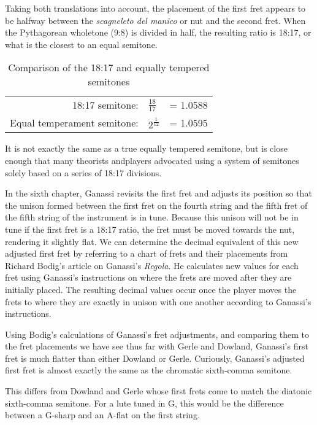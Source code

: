 Taking both translations into account, the placement of the first fret appears to be
halfway between the \textit{scagneleto del manico} or nut and the second fret.  When
the Pythagorean wholetone (9:8) is divided in half, the resulting ratio is 18:17, or
what is the closest to an equal semitone.
\begin{table}[h!]
    \begin{center}
    \begin{tabular}{ r l l }
        18:17 semitone:             & $ \frac{18}{17}  $ & = 1.0588 \\
        Equal temperament semitone: & $ 2^\frac{1}{12} $ & = 1.0595 \\
    \end{tabular}
    \end{center}
    \caption{Comparison of the 18:17 and equally tempered semitones}
\end{table}
It is not exactly the same as a true equally tempered semitone, but is close enough
that many theorists andplayers advocated using a system of semitones solely based on a
series of 18:17 divisions.

In the sixth chapter, Ganassi revisits the first fret and adjusts its position so that
the unison formed between the first fret on the fourth string and the fifth fret of the
fifth string of the instrument is in tune.\autocite[67]{RB:3}  Because this unison will
not be in tune if the first fret is a 18:17 ratio, the fret must be moved towards the
nut, rendering it slightly flat. We can determine the  decimal equivalent of this new
adjusted first fret by referring to a chart of frets and their placements from Richard
Bodig's article on Ganassi's \textit{Regola}. He calculates new values for each fret
using Ganassi's instructions on where the frets are moved after they are initially
placed. The resulting decimal values occur once the player moves the frets to where
they are exactly in unison with one another according to Ganassi's instructions.

Using Bodig's calculations of Ganassi's fret adjustments, and comparing them to the
fret placements we have see thus far with Gerle and Dowland, Ganassi's first fret is
much flatter than either Dowland or Gerle.  Curiously, Ganassi's adjusted first fret is
almost exactly the same as the chromatic sixth-comma semitone.

This differs from Dowland and Gerle whose first frets come to match the diatonic
sixth-comma semitone.  For a lute tuned in G, this would be the difference between a
G-sharp and an A-flat on the first string.

